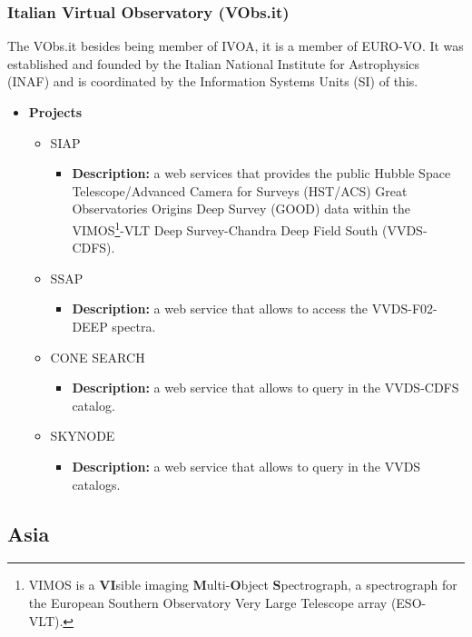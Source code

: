 \subsubsection{Italian Virtual Observatory (VObs.it)}
The VObs.it besides being member of IVOA, it is a member of EURO-VO. It was
established and founded by the Italian National Institute for Astrophysics
(INAF) and is coordinated by the Information Systems Units (SI) of this. 

\begin{itemize}
\item \textbf{Projects}
\begin{itemize}
\item SIAP
\begin{itemize}
\item \textbf{Description:} a web services that provides the public Hubble Space
Telescope/Advanced Camera for Surveys (HST/ACS) Great Observatories Origins Deep
Survey (GOOD) data within the VIMOS\footnote{VIMOS is a \textbf{VI}sible imaging
\textbf{M}ulti-\textbf{O}bject \textbf{S}pectrograph, a spectrograph for the
European Southern Observatory Very Large Telescope array (ESO-VLT).}-VLT Deep
Survey-Chandra Deep Field South (VVDS-CDFS).
\end{itemize}
\item SSAP
\begin{itemize}
\item \textbf{Description:} a web service that allows to access the
VVDS-F02-DEEP spectra.
\end{itemize}
\item CONE SEARCH
\begin{itemize}
\item \textbf{Description:} a web service that allows to query in the VVDS-CDFS
catalog. 
\end{itemize}
\item SKYNODE
\begin{itemize}
\item \textbf{Description:} a web service that allows to query in the VVDS
catalogs. 
\end{itemize}
\end{itemize}
\end{itemize}

\subsection{Asia}
